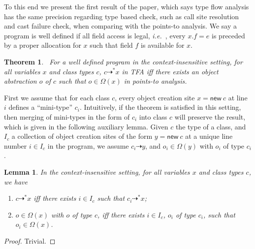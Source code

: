 \documentclass{fac}
\newcommand\ie{\textit{i.e.\ }}
\newtheorem{Theorem}{Theorem}
\newtheorem{Lemma}{Lemma}
\newcommand{\keyword}[1]{\mathsf{#1}}
\newcommand{\kwnew}[0]{\keyword{new}}
\newcommand{\VPT}{\Omega}
\newcommand{\tflow}{\dashrightarrow}
\begin{document}
To this end we present the first result of the paper, which says type flow analysis has the same precision regarding type based check, such as call site resolution and cast failure check, when comparing with the points-to analysis. We say a program is well defined if all field access is legal, \ie, every $x.f = e$ is preceded by a proper allocation for $x$ such that field $f$ is available for $x$.

\begin{Theorem}~\label{thm:tfa}
For a well defined program in the context-insensitive setting, for all variables $x$ and class types $c$, $c\tflow^*x$ in TFA iff there exists an object abstraction $o$ of $c$ such that $o\in\VPT(x)$ in points-to analysis.
\end{Theorem}

First we assume that for each class $c$, every object creation site $x = \kwnew\ c$ at line $i$ defines a ``mini-type'' $c_i$. Intuitively, if the theorem is satisfied in this setting, then merging of mini-types in the form of $c_i$ into class $c$ will preserve the result, which is given in the following auxiliary lemma. Given $c$ the type of a class, and $I_c$ a collection of object creation sites of the form $y = \kwnew\ c$ at a unique line number $i\in I_c$ in the program, we assume $c_i\tflow y$, and $o_i\in\VPT(y)$ with $o_i$ of type $c_i$.

\begin{Lemma}\label{lem:mini-type}
In the context-insensitive setting, for all variables $x$ and class types $c$, we have \begin{enumerate}
\item $c\tflow^* x$ iff there exists $i\in I_c$ such that $c_i\tflow^* x$;
\item $o\in\VPT(x)$ with $o$ of type $c$, iff there exists $i\in I_c$, $o_i$ of type $c_i$, such that $o_i\in\VPT(x)$.
\end{enumerate}
\end{Lemma}
\begin{proof}
Trivial.
\end{proof}


\end{document}
